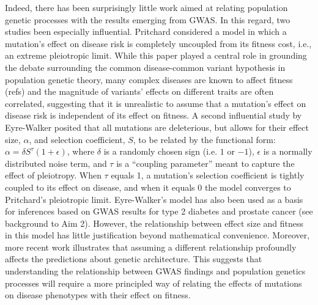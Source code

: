 \message{ !name(ResearchStrategy.tex)}\documentclass[11pt]{article}
\newcommand{\jb}[1]{{\color{blue} (#1)} }
\begin{document}
Indeed, there has been surprisingly little work aimed at relating population genetic processes with the results emerging from GWAS. In this regard, two studies been especially influential. Pritchard\cite{Pritchard:2001hw} considered a model in which a mutation’s effect on disease risk is completely uncoupled from its fitness cost, i.e., an extreme pleiotropic limit. While this paper played a central role in grounding the debate surrounding the common disease-common variant hypothesis in population genetic theory\cite{Pritchard:2002ux}, many complex diseases are known to affect fitness \jb{refs} and the magnitude of variants’ effects on different traits are often correlated\cite{BulikSullivan:2015jf,Pickrell:2016ko,Visscher:2016fp}, suggesting that it is unrealistic to assume that a mutation’s effect on disease risk is independent of its effect on fitness. A second influential study by Eyre-Walker\cite{EyreWalker:2010dn} posited that all mutations are deleterious, but allows for their effect size, $\alpha$, and selection coefficient, $S$, to be related by the functional form: $\alpha = \delta S^{\tau} (1+\epsilon)$, where $\delta$ is a randomly chosen sign (i.e. $1$ or $-1$), $\epsilon$ is a normally distributed noise term, and $\tau$ is a “coupling parameter” meant to capture the effect of pleiotropy. When $\tau$ equals 1, a mutation's selection coefficient is tightly coupled to its effect on disease, and when it equals 0 the model converges to Pritchard’s pleiotropic limit.\cite{Pritchard:2001hw} Eyre-Walker’s model has also been used as a basis for inferences based on GWAS results for type 2 diabetes\cite{Agarwala:2013bu,Fuchsberger:2016df} and prostate cancer\cite{Mancuso:2015cp} (see background to Aim 2). However, the relationship between effect size and fitness in this model has little justification beyond mathematical convenience. Moreover, more recent work illustrates that assuming a different relationship profoundly affects the predictions about genetic architecture\cite{Caballero:2015ce}. This suggests that understanding the relationship between GWAS findings and population genetics processes will require a more principled way of relating the effects of mutations on disease phenotypes with their effect on fitness.
\end{document}
